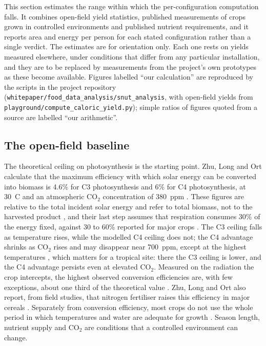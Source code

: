 This section estimates the range within which the per-configuration computation falls. It combines open-field yield statistics, published measurements of crops grown in controlled environments and published nutrient requirements, and it reports area and energy per person for each stated configuration rather than a single verdict. The estimates are for orientation only. Each one rests on yields measured elsewhere, under conditions that differ from any particular installation, and they are to be replaced by measurements from the project's own prototypes as these become available. Figures labelled ``our calculation'' are reproduced by the scripts in the project repository (\texttt{whitepaper/food\_data\_analysis/snut\_analysis}, with open-field yields from \texttt{playground/compute\_caloric\_yield.py}); simple ratios of figures quoted from a source are labelled ``our arithmetic''.

\subsection{The open-field baseline}\label{sec:nutrition-field}

The theoretical ceiling on photosynthesis is the starting point. Zhu, Long and Ort calculate that the maximum efficiency with which solar energy can be converted into biomass is 4.6\% for C3 photosynthesis and 6\% for C4 photosynthesis, at 30~\textdegree{}C and an atmospheric CO$_2$ concentration of 380~ppm \cite[Abstract, p.~153]{zhu2008maximum}. These figures are relative to the total incident solar energy and refer to total biomass, not to the harvested product \cite[Fig.~2, p.~155]{zhu2008maximum}, and their last step assumes that respiration consumes 30\% of the energy fixed, against 30 to 60\% reported for major crops \cite[p.~156]{zhu2008maximum}.%
 The C3 ceiling falls as temperature rises, while the modelled C4 ceiling does not; the C4 advantage shrinks as CO$_2$ rises and may disappear near 700~ppm, except at the highest temperatures \cite[Abstract, p.~153; Fig.~3, p.~156]{zhu2008maximum}, which matters for a tropical site: there the C3 ceiling is lower, and the C4 advantage persists even at elevated CO$_2$. Measured on the radiation the crop intercepts, the highest observed conversion efficiencies are, with few exceptions, about one third of the theoretical value \cite[p.~243]{zhu2010photosynthesis}.%
 Zhu, Long and Ort also report, from field studies, that nitrogen fertiliser raises this efficiency in major cereals \cite[p.~243]{zhu2010photosynthesis}.%
 Separately from conversion efficiency, most crops do not use the whole period in which temperatures and water are adequate for growth \cite[pp.~238--239]{zhu2010photosynthesis}. Season length, nutrient supply and CO$_2$ are conditions that a controlled environment can change.

